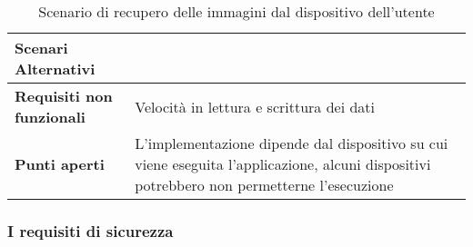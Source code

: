\begin{table}[htb]
\begin{tabular} {|P{4.5cm}|P{11cm}|}
        \hline
        \textbf{Scenari Alternativi}      &                                                                                                                                            \\
        \hline
        \textbf{Requisiti non funzionali} & Velocità in lettura e scrittura dei dati                                                                                                   \\
        \hline
        \textbf{Punti aperti}             & L'implementazione dipende dal dispositivo su cui viene eseguita l'applicazione, alcuni dispositivi potrebbero non permetterne l'esecuzione \\
        \hline
    \end{tabular}


    \caption{Scenario di recupero delle immagini dal dispositivo dell'utente}
\end{table}

\clearpage
\subsubsection{I requisiti di sicurezza}

